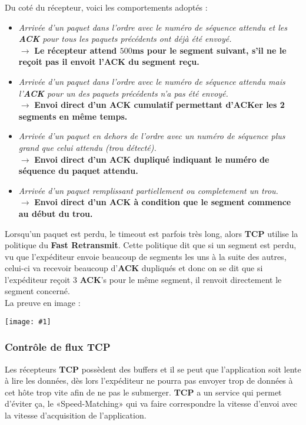 \documentclass{article}
\newcommand{\imgRT}[2]{\begin{center}\texttt{[image: \#1]}\end{center}}
\begin{document}
Du coté du récepteur, voici les comportements adoptés :
\begin{itemize}
\item \textit{Arrivée d'un paquet dans l'ordre avec le numéro de séquence attendu et les \textbf{ACK} pour tous 
les paquets précédents ont déjà été envoyé.} \\$\rightarrow$ \textbf{Le récepteur attend $500$ms pour le segment 
suivant, s'il ne le reçoit pas il envoit l'\textbf{ACK} du segment reçu.}
\item \textit{Arrivée d'un paquet dans l'ordre avec le numéro de séquence attendu mais l'\textbf{ACK} pour 
un des paquets précédents n'a pas été envoyé.} \\$\rightarrow$ \textbf{Envoi direct d'un \textbf{ACK} cumulatif 
permettant d'ACKer les 2 segments en même temps.}
\item \textit{Arrivée d'un paquet en dehors de l'ordre avec un numéro de séquence plus grand que celui attendu 
(trou détecté).} \\$\rightarrow$ \textbf{Envoi direct d'un \textbf{ACK} dupliqué indiquant le numéro de séquence 
du paquet attendu.}
\item \textit{Arrivée d'un paquet remplissant partiellement ou completement un trou.} \\$\rightarrow$ 
\textbf{Envoi direct d'un ACK à condition que le segment commence au début du trou.}
\end{itemize}

\noindent Lorsqu'un paquet est perdu, le timeout est parfois très long, alors \textbf{TCP} utilise la politique 
du \textbf{Fast Retransmit}. Cette politique dit que si un segment est perdu, vu que l'expéditeur envoie 
beaucoup de segments les uns à la suite des autres, celui-ci va recevoir beaucoup d'\textbf{ACK} dupliqués et
donc on se dit que si l'expéditeur reçoit 3 \textbf{ACK}'s pour le même segment, il renvoit directement le 
segment concerné. \\ La preuve en image :

\imgRT{CN_051.png}{200}
\newpage
\subsubsection{Contrôle de flux TCP}

Les récepteurs \textbf{TCP} possèdent des buffers et il se peut que l'application soit lente à lire les données,
dès lors l'expéditeur ne pourra pas envoyer trop de données à cet hôte trop vite afin de ne pas le submerger. 
\textbf{TCP} a un service qui permet d'éviter ça, le «Speed-Matching» qui va faire correspondre la vitesse 
d'envoi avec la vitesse d'acquisition de l'application.
\end{document}
